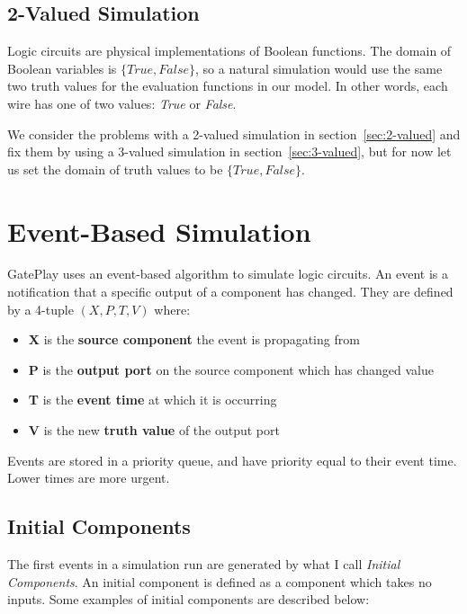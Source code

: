 \subsection{2-Valued Simulation}
Logic circuits are physical implementations of Boolean functions. The domain of Boolean variables is $\{True, False\}$, so a natural simulation would use the same two truth values for the evaluation functions in our model. In other words, each wire has one of two values: \textit{True} or \textit{False}. 

We consider the problems with a 2-valued simulation in section~\ref{sec:2-valued} and fix them by using a 3-valued simulation in section~\ref{sec:3-valued}, but for now let us set the domain of truth values to be $\{True, False\}$.

\section{Event-Based Simulation}
GatePlay uses an event-based algorithm to simulate logic circuits. An event is a notification that a specific output of a component has changed. They are defined by a 4-tuple $(X, P, T, V)$ where:

\begin{itemize}
	\item \textbf{X} is the \textbf{source component} the event is propagating from
	\item \textbf{P} is the \textbf{output port} on the source component which has changed value
	\item \textbf{T} is the \textbf{event time} at which it is occurring
	\item \textbf{V} is the new \textbf{truth value} of the output port
\end{itemize}

Events are stored in a priority queue, and have priority equal to their event time. Lower times are more urgent. 

\subsection{Initial Components}
\label{subsec:initial}
The first events in a simulation run are generated by what I call \textit{Initial Components}. An initial component is defined as a component which takes no inputs. Some examples of initial components are described below:

